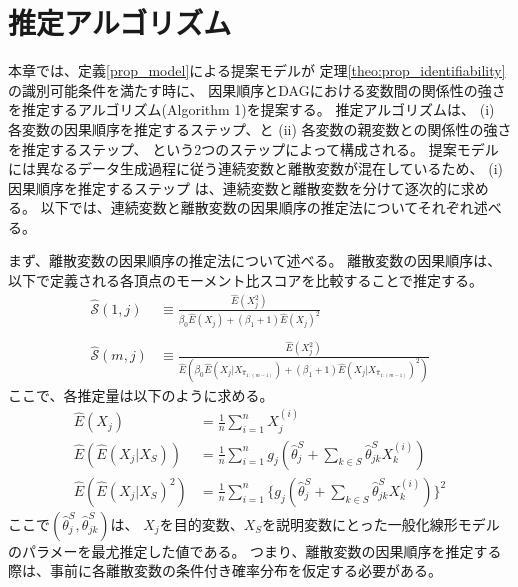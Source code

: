 
\section{推定アルゴリズム}
\label{part:algorithm}

本章では、定義\ref{prop_model}による提案モデルが
定理\ref{theo:prop_identifiability}の識別可能条件を満たす時に、
因果順序とDAGにおける変数間の関係性の強さを推定するアルゴリズム(Algorithm 1)を提案する。
推定アルゴリズムは、
(i) 各変数の因果順序を推定するステップ、と
(ii) 各変数の親変数との関係性の強さを推定するステップ、
という2つのステップによって構成される。
提案モデルには異なるデータ生成過程に従う連続変数と離散変数が混在しているため、
(i)因果順序を推定するステップ は、連続変数と離散変数を分けて逐次的に求める。
以下では、連続変数と離散変数の因果順序の推定法についてそれぞれ述べる。

まず、離散変数の因果順序の推定法について述べる。
離散変数の因果順序は、以下で定義される各頂点のモーメント比スコアを比較することで推定する。
\begin{equation}
  \begin{split}
    \widehat{\mathcal S}(1,j) &\equiv
          \frac{\widehat{E}(X_j^2)}{\beta_0 \widehat{E}(X_j) + (\beta_1 + 1)\widehat{E}(X_j)^2} \\
          \\
    \widehat{\mathcal S}(m,j) &\equiv
          \frac{\widehat{E}(X_j^2)}
          {\widehat{E}(\beta_0 \widehat{E}(X_j | X_{\widehat{\pi}_{1:(m-1)}}) +
          (\beta_1 + 1)\widehat{E}(X_j | X_{\widehat{\pi}_{1:(m-1)}})^2)}
  \end{split}
  \label{alg:MRS}
\end{equation}
ここで、各推定量は以下のように求める。
\begin{align*}
  \widehat{E}(X_j)
      &= \tfrac{1}{n}\textstyle \sum_{i=1}^n X_j^{(i)} \\
  \widehat{E}(\widehat{E}(X_j | X_S))
      &= \tfrac{1}{n}\textstyle \sum_{i=1}^n g_j(\widehat{\theta}_j^S +
         \textstyle \sum_{k\in S} \widehat{\theta}_{jk}^S X_k^{(i)}) \\
  \widehat{E}(\widehat{E}(X_j | X_S)^2)
      &= \tfrac{1}{n}\textstyle \sum_{i=1}^n \{g_j(\widehat{\theta}_j^S +
         \textstyle \sum_{k\in S} \widehat{\theta}_{jk}^S X_k^{(i)})\}^2
\end{align*}
ここで$(\widehat{\theta}_j^S, \widehat{\theta}_{jk}^S)$は、
$X_j$を目的変数、$X_S$を説明変数にとった一般化線形モデルのパラメーを最尤推定した値である。
つまり、離散変数の因果順序を推定する際は、事前に各離散変数の条件付き確率分布を仮定する必要がある。

